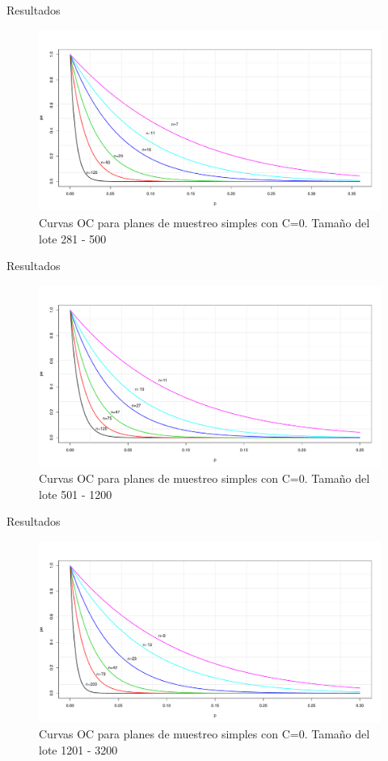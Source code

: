 \documentclass[10pt]{beamer}
\begin{document}
\begin{frame}{Resultados}
\begin{figure}[h!]
  \centering
  \includegraphics[scale=0.33]{FigurasUV/CO8.pdf}
  \caption{Curvas OC para planes de muestreo simples con C=0. Tamaño del lote 281 - 500}
\end{figure}
\end{frame}

\begin{frame}{Resultados}
\begin{figure}[h!]
  \centering
  \includegraphics[scale=0.33]{FigurasUV/CO9.pdf}
  \caption{Curvas OC para planes de muestreo simples con C=0. Tamaño del lote 501 - 1200}
\end{figure}
\end{frame}

\begin{frame}{Resultados}
\begin{figure}[h!]
  \centering
  \includegraphics[scale=0.33]{FigurasUV/CO10.pdf}
  \caption{Curvas OC para planes de muestreo simples con C=0. Tamaño del lote 1201 - 3200}
\end{figure}
\end{frame}
\end{document}
